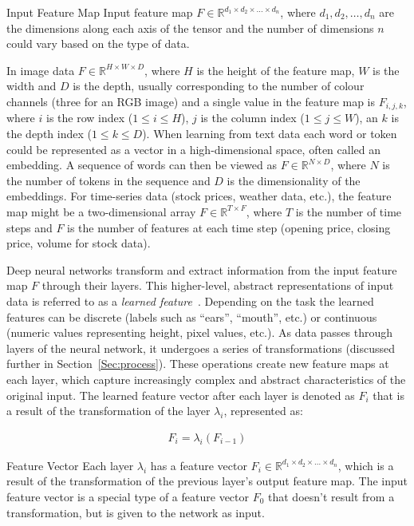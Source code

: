 \begin{Definition}{Input Feature Map}{}
Input feature map $F \in \mathbb{R}^{d_1 \times d_2 \times \ldots \times d_n}$, where $d_1, d_2, \ldots, d_n$ are the dimensions along each axis of the tensor and the number of dimensions $n$ could vary based on the type of data.
\end{Definition}

In image data $F \in \mathbb{R}^{H \times W \times D}$, where $H$ is the height of the feature map, $W$ is the width and $D$ is the depth, usually corresponding to the number of colour channels (\eg three for an RGB image) and a single value in the feature map is $F_{i, j, k}$, where $i$ is the row index ($1 \leq i \leq H$), $j$ is the column index ($1 \leq j \leq W$), an $k$ is the depth index ($1 \leq k \leq D$). When learning from text data each word or token could be represented as a vector in a high-dimensional space, often called an embedding. A sequence of words can then be viewed as $F \in \mathbb{R}^{N \times D}$, where $N$ is the number of tokens in the sequence and $D$ is the dimensionality of the embeddings. For time-series data (\eg stock prices, weather data, etc.), the feature map might be a two-dimensional array $F \in \mathbb{R}^{ T \times F}$, where $T$ is the number of time steps and $F$ is the number of features at each time step (\eg opening price, closing price, volume for stock data).


Deep neural networks transform and extract information from the input feature map $F$ through their layers. This higher-level, abstract representations of input data is referred to as a \textit{learned feature}~\cite{hinton2006reducing}. Depending on the task the learned features can be discrete (\eg labels such as ``ears”, ``mouth”, etc.) or continuous (\eg numeric values representing height, pixel values, etc.). As data passes through layers of the neural network, it undergoes a series of transformations (discussed further in Section~\ref{Sec:process}). These operations create new feature maps at each layer, which capture increasingly complex and abstract characteristics of the original input. The learned feature vector after each layer is denoted as $F_i$ that is a result of the transformation of the layer $\lambda_i$, represented as:

\begin{eqnarray}
    F_i = \lambda_i(F_{i-1})
\end{eqnarray}

\begin{Definition}{Feature Vector}{}
Each layer $\lambda_i$ has a feature vector $F_i \in \mathbb{R}^{d_1 \times d_2 \times \ldots \times d_n}$, which is a result of the transformation of the previous layer's output feature map. The input feature vector is a special type of a feature vector $F_0$ that doesn't result from a transformation, but is given to the network as input.
\end{Definition}

